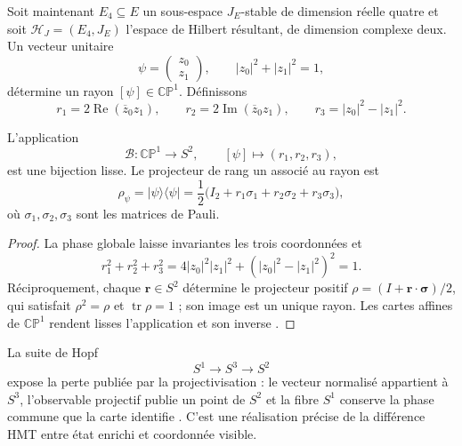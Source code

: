 Soit maintenant \(E_4\subseteq E\) un sous-espace \(J_E\)-stable de dimension réelle
quatre et soit \(\mathcal H_J=(E_4,J_E)\) l'espace de Hilbert résultant, de
dimension complexe deux.
Un vecteur unitaire
\[
 \psi=\begin{pmatrix}z_0\\z_1\end{pmatrix},
 \qquad |z_0|^2+|z_1|^2=1,
\]
détermine un rayon \([\psi]\in\mathbb {CP}^{1}\). Définissons
\begin{equation}
 r_1=2\operatorname{Re}(\overline z_0z_1),
 \qquad
 r_2=2\operatorname{Im}(\overline z_0z_1),
 \qquad
 r_3=|z_0|^2-|z_1|^2.
 \label{eq:coordenadas-bloch-rev2}
\end{equation}

\begin{theorem}
\label{thm:bloch-proyectivo-rev2}
L'application
\[
 \mathcal B:\mathbb {CP}^{1}\longrightarrow S^2,
 \qquad [\psi]\longmapsto(r_1,r_2,r_3),
\]
est une bijection lisse. Le projecteur de rang un associé au rayon est
\begin{equation}
 \rho_\psi=|\psi\rangle\langle\psi|
 =\frac12\bigl(I_2+r_1\sigma_1+r_2\sigma_2+r_3\sigma_3\bigr),
 \label{eq:proyector-bloch-rev2}
\end{equation}
où \(\sigma_1,\sigma_2,\sigma_3\) sont les matrices de Pauli.
\end{theorem}

\begin{proof}
La phase globale laisse invariantes les trois coordonnées et
\[
 r_1^2+r_2^2+r_3^2
 =4|z_0|^2|z_1|^2+(|z_0|^2-|z_1|^2)^2=1.
\]
Réciproquement, chaque \(\boldsymbol r\in S^2\) détermine le projecteur positif
\(\rho=(I+\boldsymbol r\cdot\boldsymbol\sigma)/2\), qui satisfait
\(\rho^2=\rho\) et \(\operatorname{tr}\rho=1\) ; son image est un unique rayon.
Les cartes affines de \(\mathbb {CP}^{1}\) rendent lisses l'application et son inverse
\cite{Bloch1946}.
\end{proof}

La suite de Hopf
\begin{equation}
 S^1\longrightarrow S^3\longrightarrow S^2
 \label{eq:fibrado-hopf-bloch-rev2}
\end{equation}
expose la perte publiée par la projectivisation : le vecteur normalisé
appartient à \(S^3\), l'observable projectif publie un point de \(S^2\) et
la fibre \(S^1\) conserve la phase commune que la carte identifie
\cite{Hopf1931}. C'est une réalisation précise de la différence HMT entre
état enrichi et coordonnée visible.

